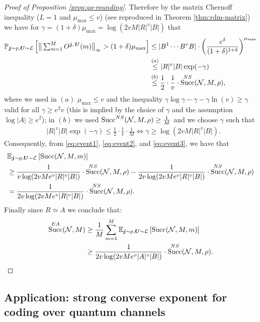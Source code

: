 \documentclass[a4paper,onecolumn,11pt,accepted=2025-10-01]{quantumarticle}
\DeclareMathOperator{\suc}{Succ}
\newcommand*{\cN}{\mathcal{N}}
\newcommand*{\cL}{\mathcal{L}}
\newcommand*{\exs}[2]{\mathbb{E}_{#1}\left[#2 \right]}
\begin{document}
\begin{proof}[Proof of Proposition \ref{prop:qq-rounding}]
Therefore by the matrix Chernoff inequality ($L=1$ and $\mu_{\max}\le v$) (see \cite[Theorem 5.1.1]{Tropp2015May} reproduced in   Theorem \ref{thm:rdm-matrix}) we have for $ \gamma = (1+\delta)\mu_{\max} =  \log(2v M |R|^{v}|B|)$ that
\begin{align}
    \mathbb{P}_{\bm{j}\sim p, \bm{U}\sim \cL} \left[\big\|\textstyle\sum_{m=1}^M O^{\bm{j}, \, \bm{U}}(m)\big\|_{\infty} >(1+\delta)\mu_{\max} \right]&\le |B^1 \cdots B^{v}B| \cdot \left(\frac{e^{\delta}}{(1+\delta)^{1+\delta}}\right)^{\mu_{\max}}
    \\&\overset{(a)}{\le} |R|^{v}|B| \exp(-\gamma)
      \\&\overset{(b)}{\le} \frac{1}{2}\cdot\frac{1}{v}\cdot  \suc^{\rm{NS}}(\cN, M,\rho),\label{eq:event3}
\end{align}
where we used in $(a)$ $\mu_{\max}\le v$ and  the inequality $\gamma\log \gamma -\gamma -\gamma\ln(v) \ge  \gamma$ valid for all $\gamma\ge e^2v$ (this is implied by the choice of $\gamma$ and the assumption  $\log|A|\ge e^2$); in $(b)$ we used $\suc_{}^{\rm{NS}}(\cN, M, \rho)  \ge \frac{1}{M}$ and we choose $\gamma$ such that 
\begin{align}
    &|R|^{v}|B| \exp(-\gamma)\le \frac{1}{2}\cdot\frac{1}{v}\cdot \frac{1}{M}
   \Leftrightarrow \gamma \ge  \log(2v M |R|^{v}|B|).
\end{align}
Consequently, from \eqref{eq:event1},  \eqref{eq:event2}, and \eqref{eq:event3}, we have that
\begin{align}
    &\exs{\bm{j}\sim p, \bm{U}\sim \cL}{\suc(\cN,M, m)}
    \\&\ge \frac{1}{v\log(2v M e^{v}|R|^{v}|B|)}\cdot  \suc^{\rm{NS}}(\cN, M,\rho) 
   - \frac{1}{2v\log(2v M e^{v}|R|^{v}|B|)}\cdot \suc^{\rm{NS}}(\cN, M,  \rho) 
    \\&= \frac{1}{2v \log(2v M e^{v}|R|^{v}|B|)}\cdot \suc_{}^{\rm{NS}}(\cN,M,\rho).
\end{align}
Finally since $R \simeq A$ we conclude that:
\begin{align}
    \suc^{\rm{EA}}(\cN,M) &\ge \frac{1}{M}\sum_{m=1}^M  \exs{\bm{j}\sim p, \bm{U}\sim \cL}{\suc(\cN,M, m)}
    \\&\ge \frac{1}{2v \log(2v M e^{v}|A|^{v}|B|)}\cdot\suc^{\rm{NS}}(\cN, M, \rho) .
\end{align}
\end{proof}


\subsection{Application: strong converse exponent for coding over quantum channels}\label{sec:qq-application-sce}
\end{document}
